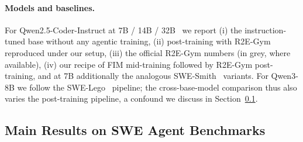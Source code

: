 \paragraph{Models and baselines.}
For Qwen2.5-Coder-Instruct at 7B / 14B / 32B~\citep{qwencoder} we report
(i) the instruction-tuned base without any agentic training, (ii)
post-training with R2E-Gym reproduced under our setup, (iii) the official
R2E-Gym numbers (in grey, where available), (iv) our recipe of FIM
mid-training followed by R2E-Gym post-training, and at 7B additionally
the analogous SWE-Smith~\citep{swesmith} variants. For Qwen3-8B we follow
the SWE-Lego~\citep{swelego} pipeline; the cross-base-model comparison
thus also varies the post-training pipeline, a confound we discuss in
Section~\ref{sec:exp:main}.

\subsection{Main Results on SWE Agent Benchmarks}
\label{sec:exp:main}



